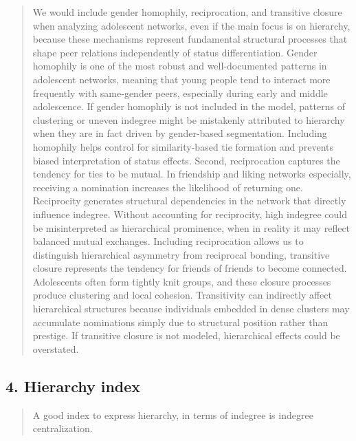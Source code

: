 \documentclass[
  letterpaper,
  DIV=11,
  numbers=noendperiod]{scrartcl}
\begin{document}
\begin{quote}
We would include gender homophily, reciprocation, and transitive closure
when analyzing adolescent networks, even if the main focus is on
hierarchy, because these mechanisms represent fundamental structural
processes that shape peer relations independently of status
differentiation. Gender homophily is one of the most robust and
well-documented patterns in adolescent networks, meaning that young
people tend to interact more frequently with same-gender peers,
especially during early and middle adolescence. If gender homophily is
not included in the model, patterns of clustering or uneven indegree
might be mistakenly attributed to hierarchy when they are in fact driven
by gender-based segmentation. Including homophily helps control for
similarity-based tie formation and prevents biased interpretation of
status effects. Second, reciprocation captures the tendency for ties to
be mutual. In friendship and liking networks especially, receiving a
nomination increases the likelihood of returning one. Reciprocity
generates structural dependencies in the network that directly influence
indegree. Without accounting for reciprocity, high indegree could be
misinterpreted as hierarchical prominence, when in reality it may
reflect balanced mutual exchanges. Including reciprocation allows us to
distinguish hierarchical asymmetry from reciprocal bonding, transitive
closure represents the tendency for friends of friends to become
connected. Adolescents often form tightly knit groups, and these closure
processes produce clustering and local cohesion. Transitivity can
indirectly affect hierarchical structures because individuals embedded
in dense clusters may accumulate nominations simply due to structural
position rather than prestige. If transitive closure is not modeled,
hierarchical effects could be overstated.
\end{quote}

\subsection{4. Hierarchy index}\label{hierarchy-index}

\begin{quote}
A good index to express hierarchy, in terms of indegree is indegree
centralization.
\end{quote}
\end{document}
